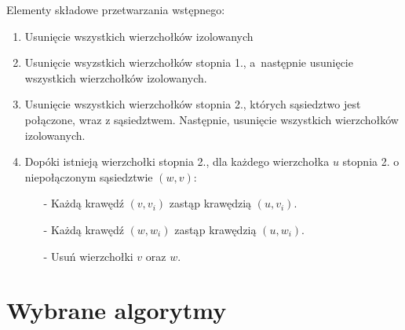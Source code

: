   Elementy składowe przetwarzania wstępnego:
  \begin{enumerate}
    \item Usunięcie wszystkich wierzchołków izolowanych
    \item Usunięcie wsyzstkich wierzchołków stopnia 1., a~następnie usunięcie
      wszystkich wierzchołków izolowanych.
    \item Usunięcie wszystkich wierzchołków stopnia 2., których sąsiedztwo jest
      połączone, wraz z sąsiedztwem. Następnie, usunięcie wszystkich
      wierzchołków izolowanych.
    \item Dopóki istnieją wierzchołki stopnia 2., dla każdego wierzchołka $u$ 
      stopnia 2. o niepołączonym sąsiedztwie $(w,v)$:
      \begin{itemize}
        \item[-] Każdą krawędź $(v,v_i)$ zastąp krawędzią $(u, v_i)$.
        \item[-] Każdą krawędź $(w,w_i)$ zastąp krawędzią $(u, w_i)$.
        \item[-] Usuń wierzchołki $v$ oraz $w$.
      \end{itemize}
  \end{enumerate}


\chapter{Wybrane algorytmy }\label{Chapter_Algorytmy}

